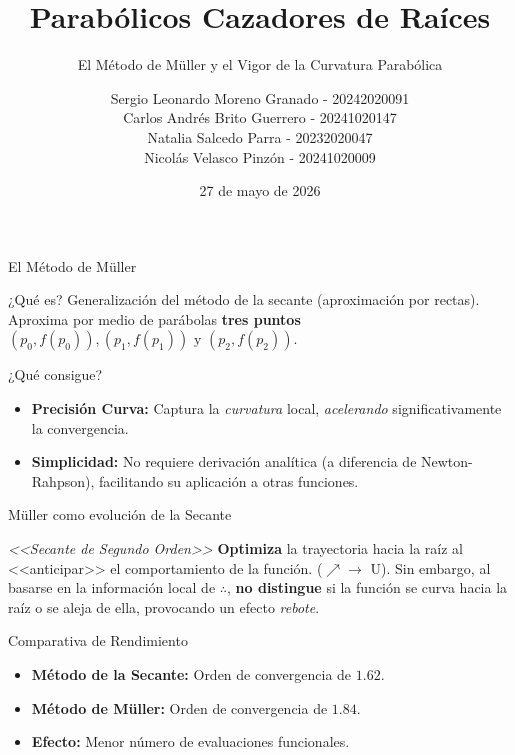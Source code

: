 \documentclass[aspectratio=169, t]{beamer}
\title{Parabólicos Cazadores de Raíces}
\subtitle{El Método de Müller y el Vigor de la Curvatura Parabólica}
\author{
    Sergio Leonardo Moreno Granado - 20242020091 \\
    Carlos Andrés Brito Guerrero - 20241020147 \\
    Natalia Salcedo Parra - 20232020047 \\
    Nicolás Velasco Pinzón - 20241020009
}
\institute{Universidad Distrital Francisco José de Caldas}
\date{27 de mayo de 2026}
\begin{document}
\begin{frame}[plain]
    \titlepage
\end{frame}

\begin{frame}{El Método de Müller}
    \begin{concept}{¿Qué es?}
        Generalización del método de la secante (aproximación por rectas). Aproxima por medio de parábolas \textbf{tres puntos} $(p_0,f(p_0)),(p_1,f(p_1)) \text{ y } (p_2,f(p_2))$.
    \end{concept}

    \vspace{0.2cm}
    \begin{mathstep}{¿Qué consigue?}
        \begin{itemize}
            \item \textbf{Precisión Curva:} Captura la \textit{curvatura} local, \textit{acelerando} significativamente la convergencia.
            \item \textbf{Simplicidad:} No requiere derivación analítica (a diferencia de Newton-Rahpson), facilitando su aplicación a otras funciones.
        \end{itemize}
    \end{mathstep}
\end{frame}

\begin{frame}{Müller como evolución de la Secante}
    \begin{concept}{\textit{<<Secante de Segundo Orden>>}}
        \textbf{Optimiza} la trayectoria hacia la raíz al <<anticipar>> el comportamiento de la función. ($\nearrow \to $ U). Sin embargo, al basarse en la información local de $\therefore$, \textbf{no distingue} si la función se curva hacia la raíz o se aleja de ella, provocando un efecto \textit{rebote}.
    \end{concept}

    \vspace{0.2cm}
    \begin{mathstep}{Comparativa de Rendimiento}
        \begin{itemize}
            \item \textbf{Método de la Secante:} Orden de convergencia de $1.62$.
            \item \textbf{Método de Müller:} Orden de convergencia de $1.84$.
            \item \textbf{Efecto:} Menor número de evaluaciones funcionales.
        \end{itemize}
    \end{mathstep}
\end{frame}
\end{document}
